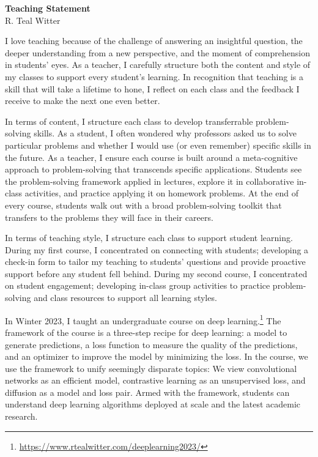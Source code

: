 \documentclass[11pt]{article}
\begin{document}
\begin{center}
	\Large \textbf{Teaching Statement} \\
	\vspace{.25em}
	\large{R. {\color{teal}Teal} Witter}
\end{center}

I love teaching because of the challenge of answering an insightful question, the deeper understanding from a new perspective, and the moment of comprehension in students' eyes.
As a teacher, I carefully structure both the content and style of my classes to support every student's learning.
In recognition that teaching is a skill that will take a lifetime to hone, I reflect on each class and the feedback I receive to make the next one even better. 

In terms of content, I structure each class to develop transferrable problem-solving skills.
As a student, I often wondered why professors asked us to solve particular problems and whether I would use (or even remember) specific skills in the future.
As a teacher, I ensure each course is built around a meta-cognitive approach to problem-solving that transcends specific applications.
Students see the problem-solving framework applied in lectures, explore it in collaborative in-class activities, and practice applying it on homework problems.
At the end of every course, students walk out with a broad problem-solving toolkit that transfers to the problems they will face in their careers.

In terms of teaching style, I structure each class to support student learning.
During my first course, I concentrated on connecting with students; developing a check-in form to tailor my teaching to students' questions and provide proactive support before any student fell behind.
During my second course, I concentrated on student engagement; developing in-class group activities to practice problem-solving and class resources to support all learning styles.


In Winter 2023, I taught an undergraduate course on deep learning.\footnote{\url{https://www.rtealwitter.com/deeplearning2023/}}
The framework of the course is a three-step recipe for deep learning: a model to generate predictions, a loss function to measure the quality of the predictions, and an optimizer to improve the model by minimizing the loss.
In the course, we use the framework to unify seemingly disparate topics:
We view convolutional networks as an efficient model, contrastive learning as an unsupervised loss, and diffusion as a model and loss pair.
Armed with the framework, students can understand deep learning algorithms deployed at scale and the latest academic research.
\end{document}
